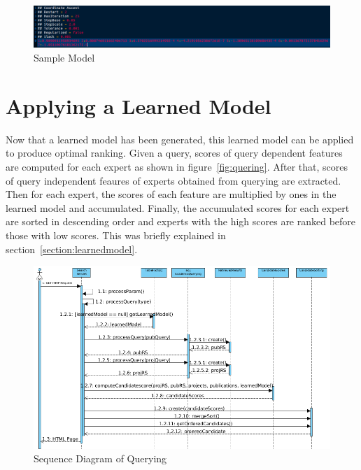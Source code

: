 \begin{figure}
\centering
\includegraphics[scale=0.3]{./figures/samplemodel.png}
\caption{Sample Model} \label{fig:samplemodel} 
\end{figure}

\section{Applying a Learned Model}\label{section:applyinglearnedmodel}
Now that a learned model has been generated, this learned model can be applied to produce optimal ranking. Given a query,
scores of query dependent features are computed for each expert as shown in figure~\ref{fig:quering}. After that, scores of query independent feaures
of experts obtained from querying are extracted. Then for each expert, the scores of each feature are multiplied by ones in the learned model and accumulated.
Finally, the accumulated scores for each expert are sorted in descending order and experts with the high scores are ranked before those with low scores. 
This was briefly explained in section~\ref{section:learnedmodel}.



\begin{figure}
\centering
\includegraphics[scale=0.5]{./figures/searchsequence.png}
\caption{Sequence Diagram of Querying} \label{fig:searchsequence} 
\end{figure}

